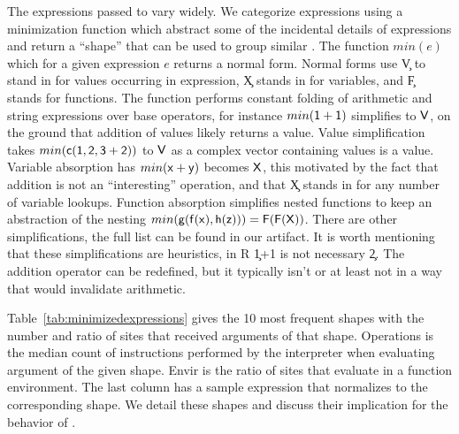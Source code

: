 \documentclass[screen,acmsmall]{acmart}%
\begin{document}
The expressions passed to \eval vary widely. We categorize expressions using a
minimization function which abstract some of the incidental details of
expressions and return a ``shape'' that can be used to group similar \evals. The
function $min(e)$ which for a given expression $e$ returns a normal form. Normal
forms use \c V to stand in for values occurring in expression, \c X stands in
for variables, and \c F stands for functions. The function performs constant
folding of arithmetic and string expressions over base operators, for instance
$min({\sf 1+1})$ simplifies to ${\sf V}$, on the ground that addition of values
likely returns a value. Value simplification takes $min({\sf c(1,2,3+2)})$ to
${\sf V}$ as a complex vector containing values is a value. Variable absorption
has $min({\sf x+y})$ becomes ${\sf X}$, this motivated by the fact that addition is
not an ``interesting'' operation, and that \c X stands in for any number of
variable lookups. Function absorption simplifies nested functions to keep an
abstraction of the nesting $min({\sf g(f(x),h(z))})={\sf F(F(X))}$. There are other
simplifications, the full list can be found in our artifact. It is worth
mentioning that these simplifications are heuristics, in R \c{1+1} is not
necessary \c 2. The addition operator can be redefined, but it typically isn't
or at least not in a way that would invalidate arithmetic.

Table~\ref{tab:minimizedexpressions} gives the 10 most frequent shapes with the
number and ratio of sites that received arguments of that shape. Operations is
the median count of instructions performed by the interpreter when evaluating
argument of the given shape. Envir is the ratio of sites that evaluate in a
function environment. The last column has a sample expression that normalizes to
the corresponding shape. We detail these shapes and discuss their implication for
the behavior of \eval.

\newcommand{\EE}[1]{{{\emph{\framebox{#1}}}}\\[1mm]}
\end{document}
